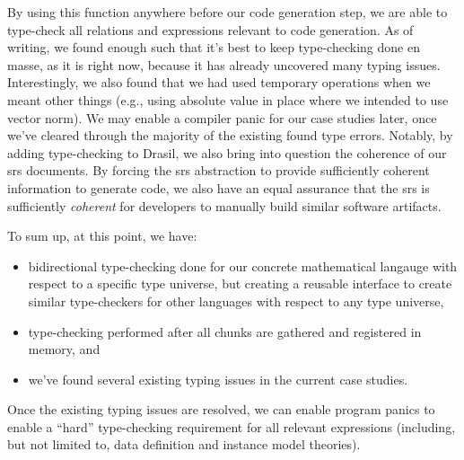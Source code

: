 By using this function anywhere before our code generation step, we are able to
type-check all relations and expressions relevant to code generation. As of
writing, we found enough such that it's best to keep type-checking done en
masse, as it is right now, because it has already uncovered many typing issues.
Interestingly, we also found that we had used temporary operations when we meant
other things (e.g., using absolute value in place where we intended to use
vector norm). We may enable a compiler panic for our case studies later, once
we've cleared through the majority of the existing found type errors. Notably,
by adding type-checking to Drasil, we also bring into question the coherence of
our \acs{srs} documents. By forcing the \acs{srs} abstraction to provide
sufficiently coherent information to generate code, we also have an equal
assurance that the \acs{srs} is sufficiently \emph{coherent} for developers to
manually build similar software artifacts.

To sum up, at this point, we have:

\begin{itemize}
      \item bidirectional type-checking done for our concrete mathematical
            langauge with respect to a specific type universe, but creating a
            reusable interface to create similar type-checkers for other
            languages with respect to any type universe,
      \item type-checking performed after all chunks are gathered and registered
            in memory, and
      \item we've found several existing typing issues in the current case
            studies.
\end{itemize}

Once the existing typing issues are resolved, we can enable program panics to
enable a ``hard'' type-checking requirement for all relevant expressions
(including, but not limited to, data definition and instance model theories).
